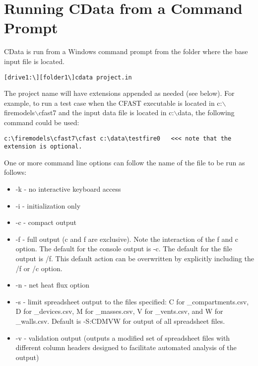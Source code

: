 \chapter{Running CData from a Command Prompt}

CData is run from a Windows command prompt from the folder where the base input file is located.

\begin{lstlisting}
[drive1:\][folder1\]cdata project.in
\end{lstlisting}

The project name will have extensions appended as needed (see below). For example, to run a test case when the CFAST executable is located in c:$\backslash$firemodels$\backslash$cfast7 and the input data file is located in c:$\backslash$data, the following command could be used:

\begin{lstlisting}
c:\firemodels\cfast7\cfast c:\data\testfire0   <<< note that the extension is optional.
\end{lstlisting}

One or more command line options can follow the name of the file to be run as follows:

\begin{itemize}
\item -k - no interactive keyboard access
\item -i - initialization only
\item -c - compact output
\item -f - full output (c and f are exclusive). Note the interaction of the f and c option. The default for the console output is -c. The default for the file output is /f. This default action can be overwritten by explicitly including the /f or /c option.
\item -n - net heat flux option
\item -s - limit spreadsheet output to the files specified: C for \_compartments.csv, D for \_devices.csv, M for \_masses.csv, V for \_vents.csv, and W for \_walls.csv. Default is -S:CDMVW for output of all spreadsheet files.
\item -v - validation output (outputs a modified set of spreadsheet files with different column headers designed to facilitate automated analysis of the output)
\end{itemize}


\label{last_page}




